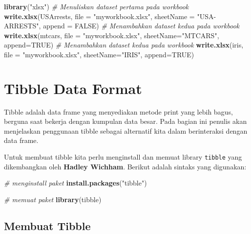 \documentclass[]{book}
\newenvironment{Shaded}{\begin{snugshade}}{\end{snugshade}}
\newcommand{\KeywordTok}[1]{\textcolor[rgb]{0.13,0.29,0.53}{\textbf{#1}}}
\newcommand{\DataTypeTok}[1]{\textcolor[rgb]{0.13,0.29,0.53}{#1}}
\newcommand{\StringTok}[1]{\textcolor[rgb]{0.31,0.60,0.02}{#1}}
\newcommand{\CommentTok}[1]{\textcolor[rgb]{0.56,0.35,0.01}{\textit{#1}}}
\newcommand{\OtherTok}[1]{\textcolor[rgb]{0.56,0.35,0.01}{#1}}
\newcommand{\NormalTok}[1]{#1}
\begin{document}
\begin{Shaded}
\begin{Highlighting}[]
\KeywordTok{library}\NormalTok{(}\StringTok{"xlsx"}\NormalTok{)}
\CommentTok{# Menuliskan dataset pertama pada workbook}
\KeywordTok{write.xlsx}\NormalTok{(USArrests, }\DataTypeTok{file =} \StringTok{"myworkbook.xlsx"}\NormalTok{,}
      \DataTypeTok{sheetName =} \StringTok{"USA-ARRESTS"}\NormalTok{, }\DataTypeTok{append =} \OtherTok{FALSE}\NormalTok{)}
\CommentTok{# Menambahkan dataset kedua pada workbook}
\KeywordTok{write.xlsx}\NormalTok{(mtcars, }\DataTypeTok{file =} \StringTok{"myworkbook.xlsx"}\NormalTok{, }
           \DataTypeTok{sheetName=}\StringTok{"MTCARS"}\NormalTok{, }\DataTypeTok{append=}\OtherTok{TRUE}\NormalTok{)}
\CommentTok{# Menambahkan dataset kedua pada workbook}
\KeywordTok{write.xlsx}\NormalTok{(iris, }\DataTypeTok{file =} \StringTok{"myworkbook.xlsx"}\NormalTok{,}
           \DataTypeTok{sheetName=}\StringTok{"IRIS"}\NormalTok{, }\DataTypeTok{append=}\OtherTok{TRUE}\NormalTok{)}
\end{Highlighting}
\end{Shaded}

\section{Tibble Data Format}\label{tibble-data-format}

Tibble adalah data frame yang menyediakan metode print yang lebih bagus,
berguna saat bekerja dengan kumpulan data besar. Pada bagian ini penulis
akan menjelaskan penggunaan tibble sebagai alternatif kita dalam
berinteraksi dengan data frame.

Untuk membuat tibble kita perlu menginstall dan memuat library
\texttt{tibble} yang dikembangkan oleh \textbf{Hadley Wichham}. Berikut
adalah sintaks yang digunakan:

\begin{Shaded}
\begin{Highlighting}[]
\CommentTok{# menginstall paket}
\KeywordTok{install.packages}\NormalTok{(}\StringTok{"tibble"}\NormalTok{)}

\CommentTok{# memuat paket}
\KeywordTok{library}\NormalTok{(tibble)}
\end{Highlighting}
\end{Shaded}

\subsection{Membuat Tibble}\label{membuat-tibble}
\end{document}
